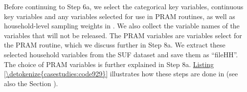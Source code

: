 \documentclass[letterpaper,10pt,english]{sphinxmanual}
\begin{document}
Before continuing to Step 6a, we select the categorical key variables,
continuous key variables and any variables selected for use in PRAM
routines, as well as household-level sampling weights in . We also
collect the variable names of the variables that will not be released.
The PRAM variables are variables select for the PRAM routine, which we
discuss further in Step 8a. We extract these selected household
variables from the SUF dataset and save them as “fileHH”. The choice of
PRAM variables is further explained in Step 8a. \hyperref[\detokenize{casestudies:code929}]{Listing \ref{\detokenize{casestudies:code929}}} illustrates
how these steps are done in  (see also the Section
).

\def\sphinxLiteralBlockLabel{\label{\detokenize{casestudies:code929}}}
%
\end{document}
